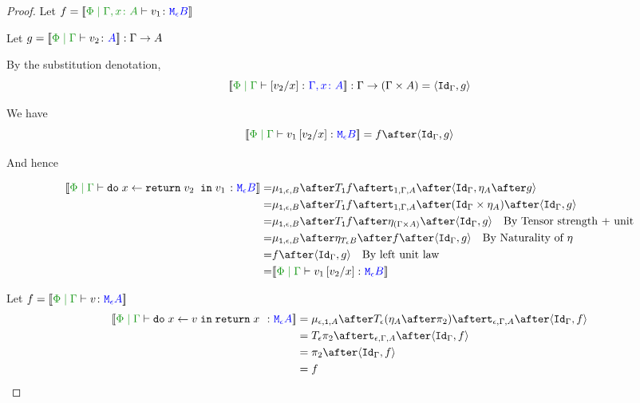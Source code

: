 \documentclass{report}
\begin{document}
\begin{framed}
\begin{proof}
        
        Let $f = \deno{\etyperelation{\P}{\gax}{v_1}{\meb}}$
        
        Let $g = \deno{\gpetyperelation{v_2}{A}}: \G \rightarrow A$
        
        By the substitution denotation, $$\deno{\etyperelation{\P}{\G}{\ssub{x}{v_2}}{\gax}}: \G \rightarrow (\G \times A) = \pr{\idg}{g}$$
        
        We have $$\deno{\gpetyperelation{v_1\ssub{x}{v_2}}{\meb}} = f \after \pr{\idg}{g}$$
        
        And hence
        
        \begin{equation}
            \begin{split}
                \deno{\gpetyperelation{\doin{x}{\return{v_2}}{v_1}}{\meb}} = &  \bind{\1}{\e}{B} \after \T{\1}{f} \after \tstrength{1}{\G}{A} \after \pr{\idg}{\point{A}\after g} \\
                = & \bind{\1}{\e}{B} \after \T{\1}{f} \after \tstrength{1}{\G}{A} \after (\idg\times \point{A}) \after \pr{\idg}{g} \\
                = & \bind{\1}{\e}{B} \after \T{\1}{f} \after \point{(\G \times A)} \after \pr{\idg}{g} \qt{By Tensor strength + unit}\\
                = & \bind{\1}{\e}{B}\after\point{\teb}\after f\after\pr{\idg}{g} \qt{By Naturality of $\point{}$}\\
                = & f\after\pr{\idg}{g} \qt{By left unit law}\\
                = & \deno{\gpetyperelation{v_1\ssub{x}{v_2}}{\meb}}\\
            \end{split}
        \end{equation}
        
        
        
        
        
        Let $f = \deno{\gpetyperelation{v}{\mea}}$ 
            \begin{equation}
            \begin{split}
                \deno{\gpetyperelation{\doin{x}{v}{\return{x}}}{\mea}}  & = \bind{\e}{\1}{A} \after \T{\e}{(\point{A} \after \pp)} \after \tstrength{\e}{\G}{A}\after \pr{\idg}{f} \\
                & = \T{\e}{\pp} \after \tstrength{\e}{\G}{A} \after \pr {\idg}{f} \\
                & = \pp \after \pr{\idg}{f}\\
                & = f
            \end{split}
        \end{equation}
        

\end{proof}
\end{framed}
\end{document}
